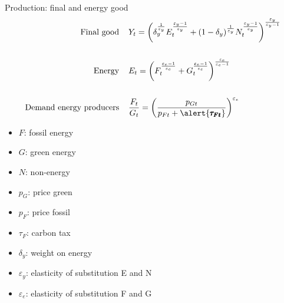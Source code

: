 \documentclass[11pt,aspectratio=169]{beamer}
\begin{document}
\begin{frame}{Production: final and energy good}
\vspace{-10mm}
\hypertarget{prodmod}{}
\begin{align*}
	\text{Final good}\hspace{4mm}&Y_t =\left(\delta_y^{\frac{1}{\varepsilon_y}}E_t^\frac{\varepsilon_y-1}{\varepsilon_y}+(1-\delta_y)^{\frac{1}{\varepsilon_y}}N_t^\frac{\varepsilon_y-1}{\varepsilon_y}\right)^\frac{\varepsilon_y}{\varepsilon_y-1} \\
	\ \\
	\text{Energy}\hspace{4mm}&E_t =\left({F}_t^\frac{\varepsilon_e-1}{\varepsilon_e}+G_t^\frac{\varepsilon_e-1}{\varepsilon_e}\right)^\frac{\varepsilon_e}{\varepsilon_e-1}\\
	\ \\
	\text{Demand energy producers}\hspace{4mm}&\frac{F_t}{G_t} = \left(\frac{p_{Gt}}{p_{Ft}+\alert{\pmb{\tau_{Ft}}}}\right)^{\varepsilon_e}
\end{align*}

\small
\vspace{4mm}
\hspace{-4mm}
\begin{minipage}[t!]{0.23\textwidth}
	\vspace{0mm}
	\begin{itemize}	
		\item[]$F$: fossil energy
		\vspace{-2mm}	
		\item[]$G$: green energy
		\vspace{-7mm}	
		\item[]$N$: non-energy
	\end{itemize}
\end{minipage}
\begin{minipage}[t!]{0.22\textwidth}
	\vspace{0mm}
	\begin{itemize}
		\item[] $p_G$: price green  \vspace{-7mm}
		\item[] $p_F$: price fossil
		\vspace{-2mm}	
		\item[] $\tau_F$: carbon tax
	\end{itemize}
\end{minipage}
\begin{minipage}[t!]{0.55\textwidth}
	\vspace{0mm}
	\begin{itemize}
		\item[] $\delta_{y}$: weight on energy\vspace{-2mm}
		\item[] $\varepsilon_y$: elasticity of substitution E and N \vspace{-2mm}
		\item[] $\varepsilon_e$: elasticity of substitution F and G
	\end{itemize}
\end{minipage}
\end{frame}
\end{document}
